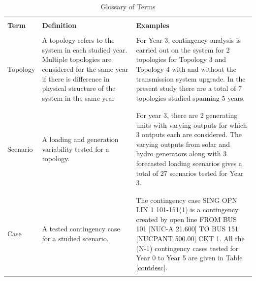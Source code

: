 \documentclass[10pt]{report}
\begin{document}
\begin{table}[H]
\caption{Glossary of Terms}
\label{glossary}
\begin{tabular}{|l|p{8cm}|p{8cm}|}
\hline
&&\\
\textbf{Term}&\textbf{Definition}&\textbf{Examples}\\[2mm] 
\hline
&&\\
Topology & A topology refers to the system in each studied year. Multiple topologies are considered for the same year if there is difference in physical structure of the system in the same year & For Year 3, contingency analysis is carried out on the system for 2 topologies for Topology 3 and Topology 4 with and without the transmission system upgrade. In the present study there are a total of 7 topologies studied spanning 5 years. \\
&&\\
\hline
&&\\
Scenario & A loading and generation variability tested for a topology. & For year 3, there are 2 generating units with varying outputs for which 3 outputs each are considered. The varying outputs from solar and hydro generators along with 3 forecasted loading scenarios gives a total of 27 scenarios tested for Year 3.\\[2mm] 
&&\\
\hline
&&\\
Case & A tested contingency case for a studied scenario. & The contingency case SING OPN LIN 1 101-151(1) is a contingency created by open line FROM BUS 101 [NUC-A 21.600] TO BUS 151 [NUCPANT 500.00] CKT 1. All the (N-1) contingency cases tested for Year 0 to Year 5 are given in Table \ref{contdesc}. \\[2mm] 
&&\\
\hline
\end{tabular}
\end{table}

\printglossaries
\end{document}
